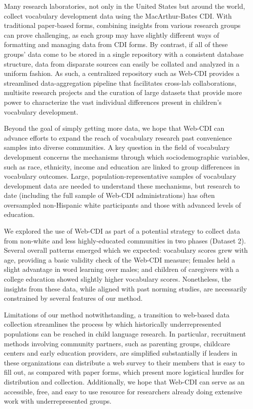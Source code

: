 \documentclass[
  english,
  ,man,floatsintext]{apa6}
\begin{document}
Many research laboratories, not only in the United States but around the world, collect vocabulary development data using the MacArthur-Bates CDI. With traditional paper-based forms, combining insights from various research groups can prove challenging, as each group may have slightly different ways of formatting and managing data from CDI forms. By contrast, if all of these groups' data come to be stored in a single repository with a consistent database structure, data from disparate sources can easily be collated and analyzed in a uniform fashion. As such, a centralized repository such as Web-CDI provides a streamlined data-aggregation pipeline that facilitates cross-lab collaborations, multisite research projects and the curation of large datasets that provide more power to characterize the vast individual differences present in children's vocabulary development.

Beyond the goal of simply getting more data, we hope that Web-CDI can advance efforts to expand the reach of vocabulary research past convenience samples into diverse communities. A key question in the field of vocabulary development concerns the mechanisms through which sociodemographic variables, such as race, ethnicity, income and education are linked to group differences in vocabulary outcomes. Large, population-representative samples of vocabulary development data are needed to understand these mechanisms, but research to date (including the full sample of Web-CDI administrations) has often oversampled non-Hispanic white participants and those with advanced levels of education.

We explored the use of Web-CDI as part of a potential strategy to collect data from non-white and less highly-educated communities in two phases (Dataset 2). Several overall patterns emerged which we expected: vocabulary scores grew with age, providing a basic validity check of the Web-CDI measure; females held a slight advantage in word learning over males; and children of caregivers with a college education showed slightly higher vocabulary scores. Nonetheless, the insights from these data, while aligned with past norming studies, are necessarily constrained by several features of our method.

Limitations of our method notwithstanding, a transition to web-based data collection streamlines the process by which historically underrepresented populations can be reached in child language research. In particular, recruitment methods involving community partners, such as parenting groups, childcare centers and early education providers, are simplified substantially if leaders in these organizations can distribute a web survey to their members that is easy to fill out, as compared with paper forms, which present more logistical hurdles for distribution and collection. Additionally, we hope that Web-CDI can serve as an accessible, free, and easy to use resource for researchers already doing extensive work with underrepresented groups.
\end{document}
